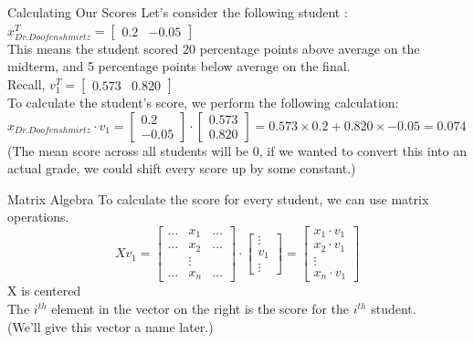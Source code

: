 \documentclass[aspectratio=169]{../latex_main/tntbeamer}  %
\begin{document}
	
	\begin{frame}{Calculating Our Scores}
	    Let’s consider the following student : $x^T_{Dr. Doofenshmirtz} = [\begin{array}{cc}
	       0.2  & -0.05
	    \end{array}]$\\
	    This means the student scored 20 percentage points above average on the midterm, and 5 percentage points below average on the final.\\
        Recall, $v_1^T = [\begin{array}{cc}
	       0.573  & 0.820
	    \end{array}] $\\
	    \bigskip
	    To calculate the student’s score, we perform the following calculation:\\
	    $x_{Dr. Doofenshmirtz} \cdot v_1 = \left[\begin{array}{c}
	         0.2  \\
	         -0.05
	    \end{array}\right] \cdot \left[\begin{array}{c}
	         0.573  \\
	         0.820
	    \end{array}\right] = 0.573\times 0.2 + 0.820\times -0.05 = 0.074 $\\
	    \bigskip
	    (The mean score across all students will be 0, if we wanted to convert this into an actual grade, we could shift every score up by some constant.)
	\end{frame}
	
	
	\begin{frame}{Matrix Algebra}
	    To calculate the score for every student, we can use matrix operations.
	    \begin{equation*}
	        Xv_1 = \left[\begin{array}{ccc}
	            \dots & x_1 & \dots \\
	            \dots & x_2 & \dots \\
	                  & \vdots & \\
	            \dots & x_n  & \dots
	        \end{array}\right] \cdot \left[\begin{array}{c}
	             \vdots\\
	             v_1\\
	             \vdots
	        \end{array}\right] = \left[\begin{array}{c}
	             x_1 \cdot v_1\\
	             x_2 \cdot v_1\\
	             \vdots\\
	             x_n \cdot v_1
	        \end{array}\right]
	    \end{equation*}
	    X is centered\\
	    \bigskip
	    The $i^{th}$ element in the vector on the right is the score for the $i^{th}$ student.\\
        (We’ll give this vector a name later.)
	\end{frame}
\end{document}
